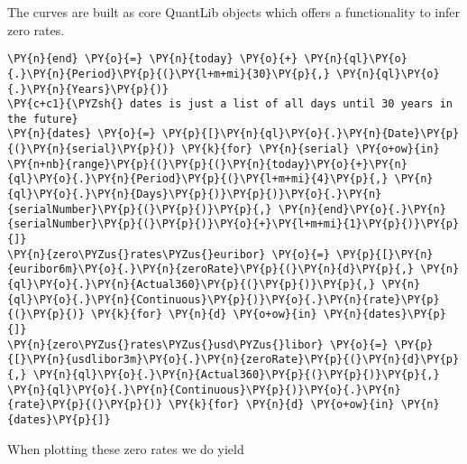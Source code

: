    The curves are built as core QuantLib objects which offers a
functionality to infer zero rates.

    \begin{tcolorbox}[breakable, size=fbox, boxrule=1pt, pad at break*=1mm,colback=cellbackground, colframe=cellborder]
\begin{Verbatim}[commandchars=\\\{\}]
\PY{n}{end} \PY{o}{=} \PY{n}{today} \PY{o}{+} \PY{n}{ql}\PY{o}{.}\PY{n}{Period}\PY{p}{(}\PY{l+m+mi}{30}\PY{p}{,} \PY{n}{ql}\PY{o}{.}\PY{n}{Years}\PY{p}{)}
\PY{c+c1}{\PYZsh{} dates is just a list of all days until 30 years in the future}
\PY{n}{dates} \PY{o}{=} \PY{p}{[}\PY{n}{ql}\PY{o}{.}\PY{n}{Date}\PY{p}{(}\PY{n}{serial}\PY{p}{)} \PY{k}{for} \PY{n}{serial} \PY{o+ow}{in} \PY{n+nb}{range}\PY{p}{(}\PY{p}{(}\PY{n}{today}\PY{o}{+}\PY{n}{ql}\PY{o}{.}\PY{n}{Period}\PY{p}{(}\PY{l+m+mi}{4}\PY{p}{,} \PY{n}{ql}\PY{o}{.}\PY{n}{Days}\PY{p}{)}\PY{p}{)}\PY{o}{.}\PY{n}{serialNumber}\PY{p}{(}\PY{p}{)}\PY{p}{,} \PY{n}{end}\PY{o}{.}\PY{n}{serialNumber}\PY{p}{(}\PY{p}{)}\PY{o}{+}\PY{l+m+mi}{1}\PY{p}{)}\PY{p}{]}
\PY{n}{zero\PYZus{}rates\PYZus{}euribor} \PY{o}{=} \PY{p}{[}\PY{n}{euribor6m}\PY{o}{.}\PY{n}{zeroRate}\PY{p}{(}\PY{n}{d}\PY{p}{,} \PY{n}{ql}\PY{o}{.}\PY{n}{Actual360}\PY{p}{(}\PY{p}{)}\PY{p}{,} \PY{n}{ql}\PY{o}{.}\PY{n}{Continuous}\PY{p}{)}\PY{o}{.}\PY{n}{rate}\PY{p}{(}\PY{p}{)} \PY{k}{for} \PY{n}{d} \PY{o+ow}{in} \PY{n}{dates}\PY{p}{]}
\PY{n}{zero\PYZus{}rates\PYZus{}usd\PYZus{}libor} \PY{o}{=} \PY{p}{[}\PY{n}{usdlibor3m}\PY{o}{.}\PY{n}{zeroRate}\PY{p}{(}\PY{n}{d}\PY{p}{,} \PY{n}{ql}\PY{o}{.}\PY{n}{Actual360}\PY{p}{(}\PY{p}{)}\PY{p}{,} \PY{n}{ql}\PY{o}{.}\PY{n}{Continuous}\PY{p}{)}\PY{o}{.}\PY{n}{rate}\PY{p}{(}\PY{p}{)} \PY{k}{for} \PY{n}{d} \PY{o+ow}{in} \PY{n}{dates}\PY{p}{]}
\end{Verbatim}
\end{tcolorbox}

    When plotting these zero rates we do yield

